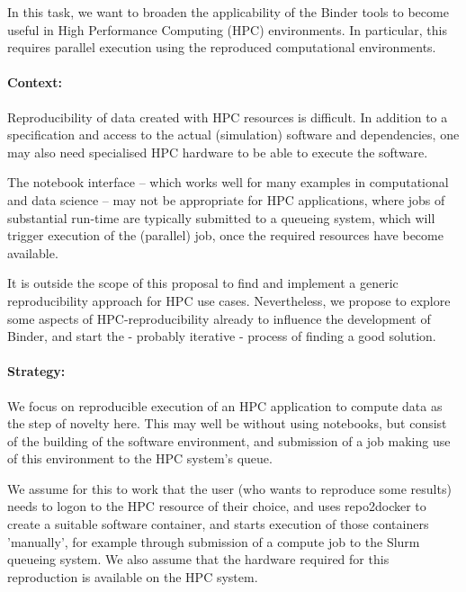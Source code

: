\begin{task}[
  title=Binder at HPC facilities,
  id=binder-at-hpc,
  lead=MP,
  PM=17,
  wphases={0-36},
  partners={IFR, UIO}
]
In this task, we want to broaden the applicability of the Binder tools to become
useful in High Performance Computing (HPC) environments. In particular, this
requires parallel execution using the reproduced computational environments.

\paragraph*{Context:}
Reproducibility of data created with HPC resources is difficult. In addition to
a specification and access to the actual (simulation) software and dependencies,
one may also need specialised HPC hardware to be able to execute the software.

The notebook interface -- which works well for many examples in computational and
data science -- may not be appropriate for HPC applications, where jobs of
substantial run-time are typically submitted to a queueing system, which will
trigger execution of the (parallel) job, once the required resources have become
available.

It is outside the scope of this proposal to find and implement a generic
reproducibility approach for HPC use cases. Nevertheless, we propose to explore
some aspects of HPC-reproducibility already to influence the development of Binder,
and start the - probably iterative - process of finding a good solution.

\paragraph*{Strategy:}
We focus on reproducible execution of an HPC application to compute data as the step of
novelty here. This may well be without using notebooks, but consist of the
building of the software environment, and submission of a job making use of this
environment to the HPC system's queue.

We assume for this to work that the user (who wants to reproduce some results)
needs to logon to the HPC resource of their choice, and uses repo2docker to
create a suitable software container, and starts execution of those containers
'manually', for example through submission of a compute job to the Slurm
queueing system. We also assume that the hardware required for this reproduction
is available on the HPC system.


\end{task}
